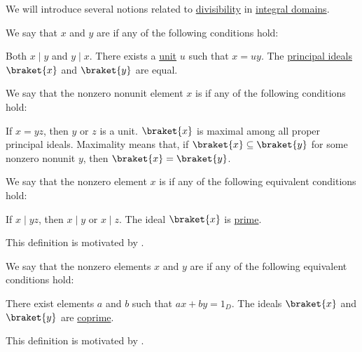 \begin{definition}\label{def:domain_divisibility}\mimprovised
  We will introduce several notions related to \hyperref[def:divisibility]{divisibility} in \hyperref[def:integral_domain]{integral domains}.

  \begin{thmenum}
     We say that \( x \) and \( y \) are  if any of the following conditions hold:
    \begin{thmenum}
       Both \( x \mid y \) and \( y \mid x \).
       There exists a \hyperref[def:divisibility/unit]{unit} \( u \) such that \( x = uy \).
       The \hyperref[def:semiring_ideal/principal]{principal ideals} \( \braket{ x } \) and \( \braket{ y } \) are equal.
    \end{thmenum}

     We say that the nonzero nonunit element \( x \) is  if any of the following conditions hold:
    \begin{thmenum}
       If \( x = yz \), then \( y \) or \( z \) is a unit.
       \( \braket{ x } \) is maximal among all proper principal ideals. Maximality means that, if \( \braket{ x } \subseteq \braket{ y } \) for some nonzero nonunit \( y \), then \( \braket{ x } = \braket{ y } \).
    \end{thmenum}

     We say that the nonzero element \( x \) is  if any of the following equivalent conditions hold:
    \begin{thmenum}
       If \( x \mid yz \), then \( x \mid y \) or \( x \mid z \).
       The ideal \( \braket{ x } \) is \hyperref[def:semiring_ideal/prime]{prime}.
    \end{thmenum}

    This definition is motivated by .

     We say that the nonzero elements \( x \) and \( y \) are  if any of the following equivalent conditions hold:
    \begin{thmenum}
       There exist elements \( a \) and \( b \) such that \( ax + by = 1_D \).
       The ideals \( \braket{ x } \) and \( \braket{ y } \) are \hyperref[def:semiring_ideal/coprime]{coprime}.
    \end{thmenum}

    This definition is motivated by .
  \end{thmenum}
\end{definition}
